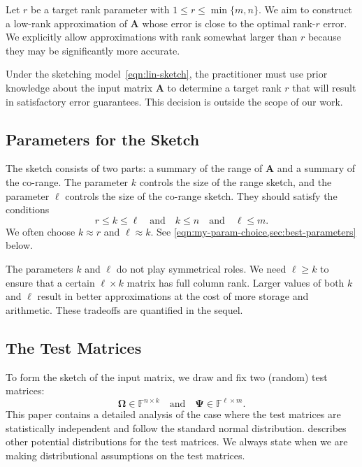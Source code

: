 \documentclass[final]{siamart1116}
\numberwithin{equation}{section}
\numberwithin{theorem}{section}
\numberwithin{figure}{section}
\newcommand{\F}{\mathbb{F}}
\newcommand{\mtx}[1]{\bm{#1}}
\begin{document}
Let $r$ be a target rank parameter with $1 \leq r \leq \min\{m,n\}$.
We aim to construct a low-rank approximation of $\mtx{A}$ whose error is
close to the optimal rank-$r$ error. We explicitly allow approximations with rank somewhat
larger than $r$ because they may be significantly more accurate.

Under the sketching model~\cref{eqn:lin-sketch},
the practitioner must use prior knowledge
about the input matrix $\mtx{A}$ to determine a target rank $r$
that will result in satisfactory error guarantees.
This decision is outside the scope of our work.


\subsection{Parameters for the Sketch}

The sketch consists of two parts: a summary of the range of $\mtx{A}$
and a summary of the co-range.
The parameter $k$ controls the size of the range sketch,
and the parameter $\ell$ controls the size of the co-range sketch.
They should satisfy the conditions
\begin{equation} \label{eqn:param-assumption}
r \leq k \leq \ell
\quad\text{and}\quad
k \leq n
\quad\text{and}\quad
\ell \leq m.
\end{equation}
We often choose $k \approx r$ and $\ell \approx k$.
See \cref{eqn:my-param-choice,sec:best-parameters} below.

The parameters $k$ and $\ell$ do not play symmetrical roles.
We need $\ell \geq k$ to ensure that a certain $\ell \times k$ matrix has full column rank.
Larger values of both $k$ and $\ell$ result in better approximations
at the cost of more storage and arithmetic.  These tradeoffs are quantified in the sequel.



\subsection{The Test Matrices}

To form the sketch of the input matrix,
we draw and fix two (random) test matrices:
\begin{equation} \label{eqn:test-matrices}
\mtx{\Omega} \in \F^{n \times k}
\quad\text{and}\quad
\mtx{\Psi} \in \F^{\ell \times m}.
\end{equation}
This paper contains a detailed analysis of the case where the
test matrices are statistically independent and follow the standard normal distribution.
 describes other potential distributions for the test matrices.
We always state when we are making distributional assumptions on the test matrices.
\end{document}

